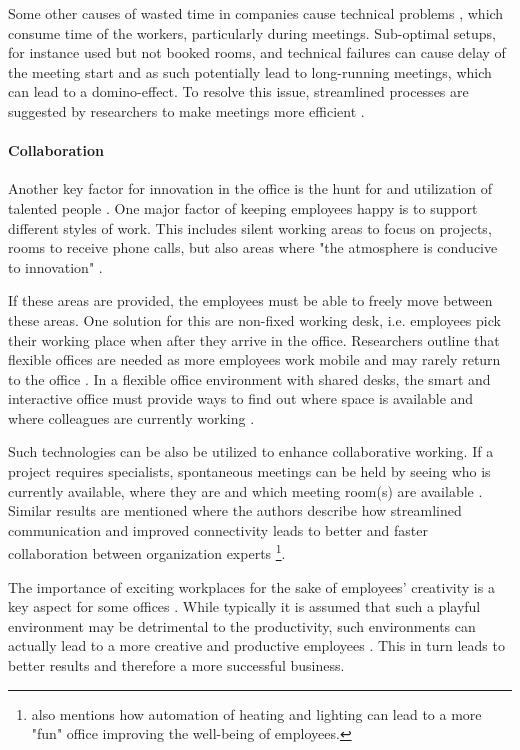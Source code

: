 Some other causes of wasted time in companies cause technical problems \cite{roomzilla3}, which consume time of the workers, particularly during meetings. Sub-optimal setups, for instance used but not 
booked rooms, and technical failures can cause delay of the meeting start and as such potentially 
lead to long-running meetings, which can lead to a domino-effect. To resolve this issue, streamlined processes are suggested by researchers to make meetings more efficient \cite{roomzilla3}. 

\paragraph{Collaboration}
\label{sec:sda-collaboration}
Another key factor for innovation in the office is the hunt for and 
utilization of talented people \cite{hub13}. One major factor of keeping employees happy is to support different 
styles of work. This includes silent working areas to focus on projects, rooms to receive phone 
calls, but also areas where "the atmosphere is conducive to innovation" \cite{tieto}.

If these areas are provided, the employees must be able to freely move between these areas. One 
solution for this are non-fixed working desk, i.e. employees pick their working place when after 
they arrive in the office. Researchers outline that flexible offices are needed as more 
employees work mobile and may rarely return to the office \cite{occupiee}. In a flexible office environment with 
shared desks, the smart and interactive office must provide ways to find out where space is 
available and where colleagues are currently working \cite{tieto}.

Such technologies can be also be utilized to enhance collaborative working. If a project requires 
specialists, spontaneous meetings can be held by seeing who is currently available, where they are 
and which meeting room(s) are available \cite{tieto}. Similar results are mentioned \cite{hbcommunications} 
where the authors describe how streamlined communication and improved connectivity leads to better 
and faster collaboration between organization experts \footnote{\cite{hbcommunications} also 
mentions how automation of heating and lighting can lead to a more "fun" office improving the 
well-being of employees.}.

The importance of exciting workplaces for the sake of employees' creativity is a key aspect for some offices
\cite{roomzilla3}. While typically it is assumed that such a playful environment may be detrimental 
to the productivity, such environments can actually lead to a more creative and 
productive employees \cite{metroffice}. This in turn leads to better results and therefore a more 
successful business.

